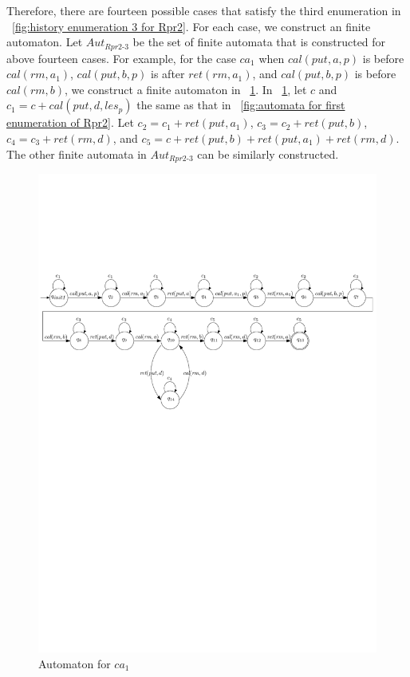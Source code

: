 Therefore, there are fourteen possible cases that satisfy the third enumeration in \figurename~\ref{fig:history enumeration 3 for Rpr2}. For each case, we construct an finite automaton. Let $\textit{Aut}_{\textit{Rpr2-3}}$ be the set of finite automata that is constructed for above fourteen cases. For example, for the case $\textit{ca}_1$ when $\textit{cal}(\textit{put},a,p)$ is before $\textit{cal}(\textit{rm},a_1)$, $\textit{cal}(\textit{put},b,p)$ is after $\textit{ret}(\textit{rm},a_1)$, and $\textit{cal}(\textit{put},b,p)$ is before $\textit{cal}(\textit{rm},b)$, we construct a finite automaton in \figurename~\ref{fig:automata for ca1 of third enumeration of Rpr2}. In \figurename~\ref{fig:automata for ca1 of third enumeration of Rpr2}, let $c$ and $c_1 = c + \textit{cal}(\textit{put},d,\textit{les}_p)$ the same as that in \figurename~\ref{fig:automata for first enumeration of Rpr2}. Let $c_2 = c_1 + \textit{ret}(\textit{put},a_1)$, $c_3 = c_2 + \textit{ret}(\textit{put},b)$, $c_4 = c_3 + \textit{ret}(\textit{rm},d)$, and $c_5 = c + \textit{ret}(\textit{put},b) + \textit{ret}(\textit{put},a_1) + \textit{ret}(\textit{rm},d)$. The other finite automata in $\textit{Aut}_{\textit{Rpr2-3}}$ can be similarly constructed.

\begin{figure}[htbp]
  \centering
  \includegraphics[width=0.8 \textwidth]{PIC_AUTO_Rpr2_3.pdf}
  \caption{Automaton for $\textit{ca}_1$}
  \label{fig:automata for ca1 of third enumeration of Rpr2}
\end{figure}


